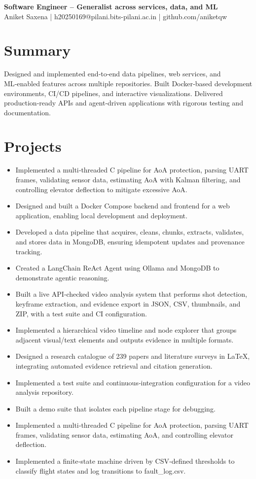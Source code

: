 \documentclass[11pt,a4paper]{article}
\begin{document}
\begin{center}{\LARGE\bfseries Software Engineer – Generalist across services, data, and ML}\\[4pt]
Aniket Saxena | h20250169@pilani.bits-pilani.ac.in | github.com/aniketqw\end{center}

\section*{Summary}
Designed and implemented end‑to‑end data pipelines, web services, and ML‑enabled features across multiple repositories. Built Docker‑based development environments, CI/CD pipelines, and interactive visualizations. Delivered production‑ready APIs and agent‑driven applications with rigorous testing and documentation.

\section*{Projects}
\begin{itemize}
  \item Implemented a multi‑threaded C pipeline for AoA protection, parsing UART frames, validating sensor data, estimating AoA with Kalman filtering, and controlling elevator deflection to mitigate excessive AoA.
  \item Designed and built a Docker Compose backend and frontend for a web application, enabling local development and deployment.
  \item Developed a data pipeline that acquires, cleans, chunks, extracts, validates, and stores data in MongoDB, ensuring idempotent updates and provenance tracking.
  \item Created a LangChain ReAct Agent using Ollama and MongoDB to demonstrate agentic reasoning.
  \item Built a live API‑checked video analysis system that performs shot detection, keyframe extraction, and evidence export in JSON, CSV, thumbnails, and ZIP, with a test suite and CI configuration.
  \item Implemented a hierarchical video timeline and node explorer that groups adjacent visual/text elements and outputs evidence in multiple formats.
  \item Designed a research catalogue of 239 papers and literature surveys in LaTeX, integrating automated evidence retrieval and citation generation.
  \item Implemented a test suite and continuous‑integration configuration for a video analysis repository.
  \item Built a demo suite that isolates each pipeline stage for debugging.
  \item Implemented a multi‑threaded C pipeline for AoA protection, parsing UART frames, validating sensor data, estimating AoA, and controlling elevator deflection.
  \item Implemented a finite‑state machine driven by CSV‑defined thresholds to classify flight states and log transitions to fault\_log.csv.
\end{itemize}
\end{document}
